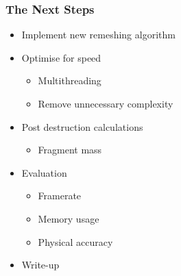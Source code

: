 \documentclass{beamer}
\begin{document}
	\begin{frame}
	\frametitle{The Next Steps}	
		\begin{itemize}
		\item{Implement new remeshing algorithm}
		\item{Optimise for speed}
			\begin{itemize}
				\item{Multithreading}
				\item{Remove unnecessary complexity}
			\end{itemize}
		\item{Post destruction calculations}
			\begin{itemize}
				\item{Fragment mass}
			\end{itemize}
		\item{Evaluation}
			\begin{itemize}
				\item{Framerate}
				\item{Memory usage}
				\item{Physical accuracy}
			\end{itemize}
		\item{Write-up}
		\end{itemize}
	\end{frame}
\end{document}
